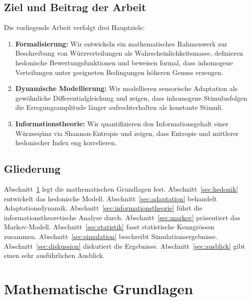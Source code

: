 ﻿\documentclass[12pt,a4paper]{article}
\theoremstyle{definition}
\begin{document}
\subsection{Ziel und Beitrag der Arbeit}

Die vorliegende Arbeit verfolgt drei Hauptziele:
\begin{enumerate}[label=(\roman*)]
  \item \textbf{Formalisierung:} Wir entwickeln ein mathematisches
  Rahmenwerk zur Beschreibung von Würzverteilungen als
  Wahrscheinlichkeitsmasse, definieren hedonische Bewertungsfunktionen
  und beweisen formal, dass inhomogene Verteilungen unter geeigneten
  Bedingungen höheren Genuss erzeugen.

  \item \textbf{Dynamische Modellierung:} Wir modellieren sensorische
  Adaptation als gewöhnliche Differentialgleichung und zeigen, dass
  inhomogene Stimulusfolgen die Erregungsamplitude länger aufrechterhalten
  als konstante Stimuli.

  \item \textbf{Informationstheorie:} Wir quantifizieren den
  Informationsgehalt einer Würzseqünz via Shannon-Entropie und zeigen,
  dass Entropie und mittlerer hedonischer Index eng korrelieren.
\end{enumerate}

\subsection{Gliederung}

Abschnitt~\ref{sec:grundlagen} legt die mathematischen Grundlagen fest.
Abschnitt~\ref{sec:hedonik} entwickelt das hedonische Modell.
Abschnitt~\ref{sec:adaptation} behandelt Adaptationsdynamik.
Abschnitt~\ref{sec:informationstheorie} führt die informationstheoretische
Analyse durch. Abschnitt~\ref{sec:markov} präsentiert das Markov-Modell.
Abschnitt~\ref{sec:statistik} fasst statistische Kenngrössen zusammen.
Abschnitt~\ref{sec:simulation} beschreibt Simulationsergebnisse.
Abschnitt~\ref{sec:diskussion} diskutiert die Ergebnisse.
Abschnitt~\ref{sec:ausblick} gibt einen sehr ausführlichen Ausblick.

\section{Mathematische Grundlagen}\label{sec:grundlagen}
\end{document}

